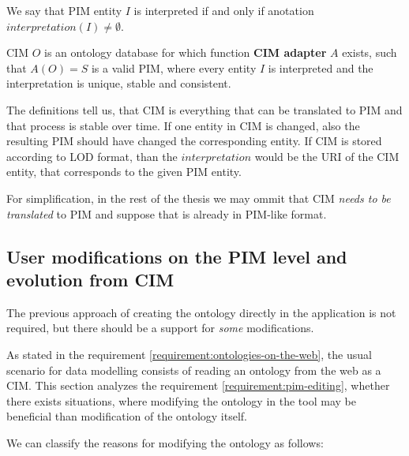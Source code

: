 
\begin{definition}[interpretation]
    We say that PIM entity $I$ is interpreted if and only if anotation $interpretation(I) \neq \emptyset$.
\end{definition}

\begin{definition}[CIM]
    CIM $O$ is an ontology database for which function \textbf{CIM adapter} $A$ exists, such that $A(O) = S$ is a valid PIM, where every entity $I$ is interpreted and the interpretation is unique, stable and consistent.
\end{definition}

The definitions tell us, that CIM is everything that can be translated to PIM and that process is stable over time. If one entity in CIM is changed, also the resulting PIM should have changed the corresponding entity. If CIM is stored according to LOD format, than the $interpretation$ would be the URI of the CIM entity, that corresponds to the given PIM entity.

For simplification, in the rest of the thesis we may ommit that CIM \textit{needs to be translated} to PIM and suppose that is already in PIM-like format.




\newpage\subsection{User modifications on the PIM level and evolution from CIM}

\begin{requirement}
    \label{requirement:pim-editing}
    The previous approach of creating the ontology directly in the application is not required, but there should be a support for \textit{some} modifications.
\end{requirement}

As stated in the requirement \ref{requirement:ontologies-on-the-web}, the usual scenario for data modelling consists of reading an ontology from the web as a CIM. This section analyzes the requirement \ref{requirement:pim-editing}, whether there exists situations, where modifying the ontology in the tool may be beneficial than modification of the ontology itself.

We can classify the reasons for modifying the ontology as follows:

